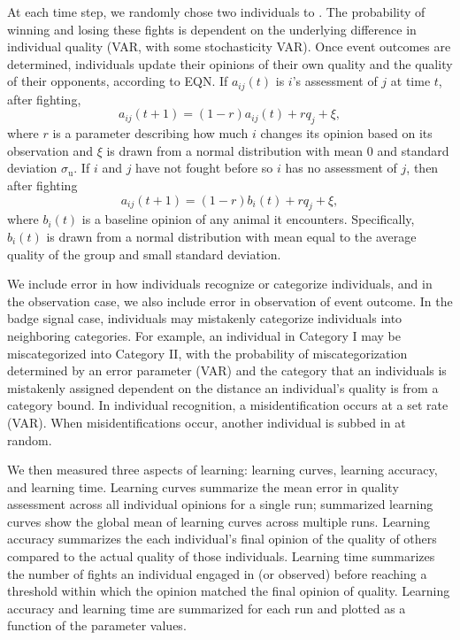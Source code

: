 At each time step, we randomly chose two individuals to . The probability of winning and losing these fights is dependent on the underlying difference in individual quality (VAR, with some stochasticity VAR). Once event outcomes are determined, individuals update their opinions of their own quality and the quality of their opponents, according to EQN. If $a_{ij}(t)$ is $i$'s assessment of $j$ at time $t$, after fighting, 
\begin{equation*}
a_{ij}(t+1)=(1-r)a_{ij}(t)+rq_j+\xi,
\end{equation*}
where $r$ is a parameter describing how much $i$ changes its opinion based on its observation and $\xi$ is drawn from a normal distribution with mean $0$ and standard deviation $\sigma_\text{u}$. If $i$ and $j$ have not fought before so $i$ has no assessment of $j$, then after fighting 
\begin{equation*}
a_{ij}(t+1)=(1-r)b_{i}(t)+rq_j+\xi,
\end{equation*}
where $b_i(t)$ is a baseline opinion of any animal it encounters. Specifically, $b_i(t)$ is drawn from a normal distribution with mean equal to the average quality of the group and small standard deviation. 


We include error in how individuals recognize or categorize individuals, and in the observation case, we also include error in observation of event outcome. In the badge signal case, individuals may mistakenly categorize individuals into neighboring categories. For example, an individual in Category I may be miscategorized into Category II, with the probability of miscategorization determined by an error parameter (VAR) and the category that an individuals is mistakenly assigned dependent on the distance an individual's quality is from a category bound. In individual recognition, a misidentification occurs at a set rate (VAR). When misidentifications occur, another individual is subbed in at random.  

We then measured three aspects of learning: learning curves, learning accuracy, and learning time. Learning curves summarize the mean error in quality assessment across all individual opinions for a single run; summarized learning curves show the global mean of learning curves across multiple runs. Learning accuracy summarizes the each individual's final opinion of the quality of others compared to the actual quality of those individuals. Learning time summarizes the number of fights an individual engaged in (or observed) before reaching a threshold within which the opinion matched the final opinion of quality. Learning accuracy and learning time are summarized for each run and plotted as a function of the parameter values. 


